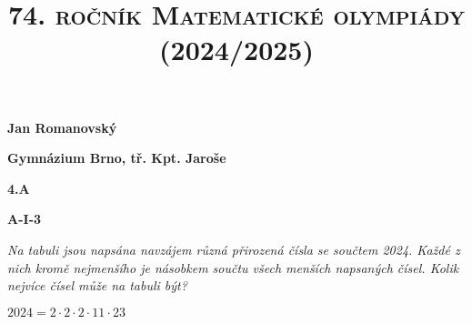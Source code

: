 \documentclass{article}
\title{\normalsize{\vspace{-2cm}\textsc{74. ročník Matematické olympiády (2024/2025)}\vspace{-1.7cm}}}
\date{}
\author{}
\begin{document}
\maketitle

\textbf{ }

\noindent \textbf{Jan Romanovský}

\noindent \textbf{Gymnázium Brno, tř. Kpt. Jaroše}

\noindent \textbf{4.A}

\noindent \textbf{A-\textrm{I}-3}

\textbf{ }

\textit{Na tabuli jsou napsána navzájem různá přirozená čísla se součtem 2024. Každé z nich kromě nejmenšího je násobkem součtu všech menších napsaných čísel. Kolik nejvíce čísel může na tabuli být?}

\textbf{ }

$2024 = 2 \cdot 2 \cdot 2 \cdot 11 \cdot 23$
\end{document}
